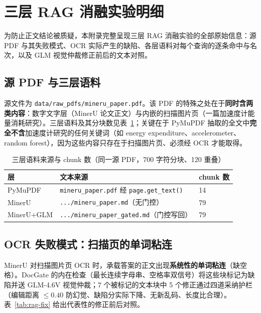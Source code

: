 \documentclass[UTF8,a4paper,11pt]{ctexart}
\begin{document}
\section{三层 RAG 消融实验明细}
\label{app:rag-detail}

为防止正文结论被质疑，本附录完整呈现三层 RAG 消融实验的全部原始信息：源 PDF 与其失败模式、OCR 实际产生的缺陷、各层语料对每个查询的逐条命中与名次，以及 GLM 视觉仲裁修正前后的文本对照。

\subsection{源 PDF 与三层语料}

源文件为 \texttt{data/raw\_pdfs/mineru\_paper.pdf}。该 PDF 的特殊之处在于\textbf{同时含两类内容}：数字文字层（MinerU 论文正文）与内嵌的扫描图片页（一篇加速度计能量消耗研究）。三层语料及其分块数见表~\ref{tab:rag-corpora}；关键在于 PyMuPDF 抽取的全文中\textbf{完全不含}加速度计研究的任何关键词（如 energy expenditure、accelerometer、random forest），因为这些内容只存在于扫描图片页、必须经 OCR 才能取得。

\begin{table}[H]
\centering
\caption{三层语料来源与 chunk 数（同一源 PDF，700 字符分块、120 重叠）}
\label{tab:rag-corpora}
\begin{tabular}{lll}
\toprule
层 & 文本来源 & chunk 数 \\
\midrule
PyMuPDF & \texttt{mineru\_paper.pdf} 经 \texttt{page.get\_text()} & 14 \\
MinerU & \texttt{.../mineru\_paper.md}（无门控） & 79 \\
MinerU+GLM & \texttt{.../mineru\_paper\_gated.md}（门控写回） & 79 \\
\bottomrule
\end{tabular}
\end{table}

\subsection{OCR 失败模式：扫描页的单词粘连}

MinerU 对扫描图片页 OCR 时，承载答案的正文出现\textbf{系统性的单词粘连}（缺空格）。DocGate 的内在检查（最长连续字母串、空格率双信号）将这些块标记为缺陷并送 GLM-4.6V 视觉仲裁；7 个被标记的文本块中 5 个修正通过四道采纳护栏（编辑距离 $\le 0.40$ 防幻觉、缺陷分实际下降、无新乱码、长度比合理）。表~\ref{tab:rag-fix} 给出代表性的修正前后对照。
\end{document}
